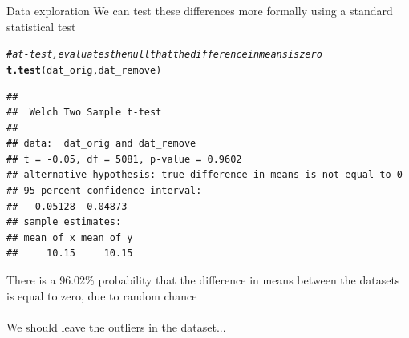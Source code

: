 \documentclass[xcolor=svgnames]{beamer}\usepackage[]{graphicx}\usepackage[]{color}
\makeatletter
\newcommand{\hlnum}[1]{\textcolor[rgb]{0.686,0.059,0.569}{#1}}%
\newcommand{\hlcom}[1]{\textcolor[rgb]{0.678,0.584,0.686}{\textit{#1}}}%
\newcommand{\hlopt}[1]{\textcolor[rgb]{0,0,0}{#1}}%
\newcommand{\hlstd}[1]{\textcolor[rgb]{0.345,0.345,0.345}{#1}}%
\newcommand{\hlkwb}[1]{\textcolor[rgb]{0.69,0.353,0.396}{#1}}%
\newcommand{\hlkwd}[1]{\textcolor[rgb]{0.737,0.353,0.396}{\textbf{#1}}}%
\newenvironment{kframe}{%
 \def\at@end@of@kframe{}%
 \ifinner\ifhmode%
  \def\at@end@of@kframe{\end{minipage}}%
  \begin{minipage}{\columnwidth}%
 \fi\fi%
 \def\FrameCommand##1{\hskip\@totalleftmargin \hskip-\fboxsep
 \colorbox{shadecolor}{##1}\hskip-\fboxsep
     \hskip-\linewidth \hskip-\@totalleftmargin \hskip\columnwidth}%
 \MakeFramed {\advance\hsize-\width
   \@totalleftmargin\z@ \linewidth\hsize
   \@setminipage}}%
 {\par\unskip\endMakeFramed%
 \at@end@of@kframe}
\newenvironment{knitrout}{}{} %
\makeatother
\begin{document}

\begin{frame}{Data exploration}
We can test these differences more formally using a standard statistical test
\begin{knitrout}\scriptsize
{}\color{fgcolor}\begin{kframe}
\begin{alltt}
\hlcom{# a t-test, evaluates the null that the difference in means is zero}
\hlkwd{t.test}\hlstd{(dat_orig, dat_remove)}
\end{alltt}
\begin{verbatim}
## 
## 	Welch Two Sample t-test
## 
## data:  dat_orig and dat_remove
## t = -0.05, df = 5081, p-value = 0.9602
## alternative hypothesis: true difference in means is not equal to 0
## 95 percent confidence interval:
##  -0.05128  0.04873
## sample estimates:
## mean of x mean of y 
##     10.15     10.15
\end{verbatim}
\end{kframe}
\end{knitrout}
There is a 96.02\% probability that the difference in means between the datasets is equal to zero, due to random chance\\~\\
We should leave the outliers in the dataset...
\end{frame}
\end{document}
